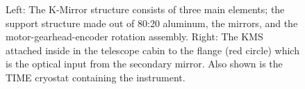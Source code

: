 \documentclass[manuscript]{aastex}
\begin{document}
\begin{figure}[ht!]
	\centering
	\qquad
	\singlespace
	\caption[CAD Model of the K-Mirror Structure.]{Left: The K-Mirror structure consists of three main elements; the support structure made out of 80:20 aluminum, the mirrors, and the motor-gearhead-encoder rotation assembly. Right: The KMS attached inside in the telescope cabin to the flange (red circle) which is the optical input from the secondary mirror. Also shown is the TIME cryostat containing the instrument.}%
	\label{fig:km23}%
\end{figure}
\end{document}
